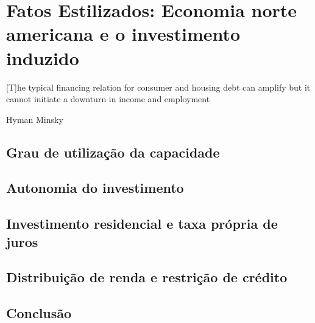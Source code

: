 \chapter{Fatos Estilizados: Economia norte americana e o investimento induzido}\label{CapFatos}

\epigraph{[T]he typical
financing relation for consumer and housing debt can amplify but it cannot initiate a
downturn in income and employment}{Hyman Minsky}


\section{Grau de utilização da capacidade}

\section{Autonomia do investimento}

\section{Investimento residencial e taxa própria de juros}

\section{Distribuição de renda e restrição de crédito}

\section{Conclusão}
